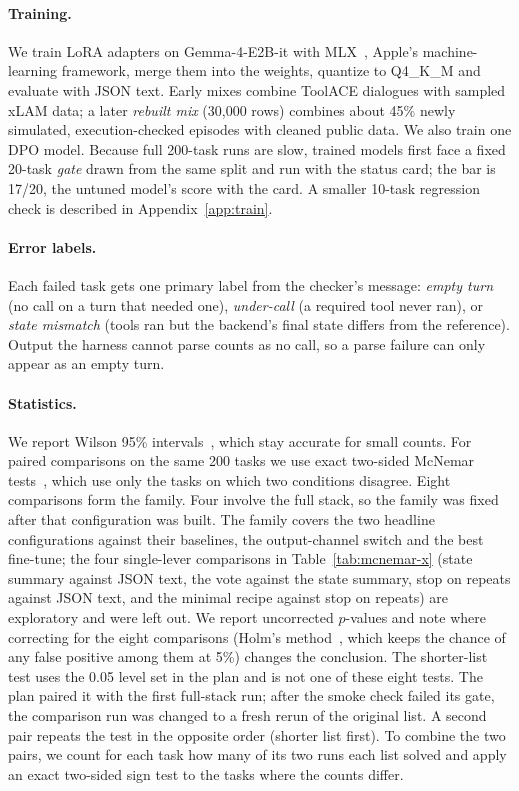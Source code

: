 \documentclass[11pt]{article}
\begin{document}
\paragraph{Training.} We train LoRA adapters on Gemma-4-E2B-it with MLX~\cite{mlx}, Apple's machine-learning framework, merge them into the weights, quantize to Q4\_K\_M and evaluate with JSON text. Early mixes combine ToolACE dialogues with sampled xLAM data; a later \emph{rebuilt mix} (30{,}000 rows) combines about 45\% newly simulated, execution-checked episodes with cleaned public data. We also train one DPO model. Because full 200-task runs are slow, trained models first face a fixed 20-task \emph{gate} drawn from the same split and run with the status card; the bar is 17/20, the untuned model's score with the card. A smaller 10-task regression check is described in Appendix~\ref{app:train}.

\paragraph{Error labels.} Each failed task gets one primary label from the checker's message: \emph{empty turn} (no call on a turn that needed one), \emph{under-call} (a required tool never ran), or \emph{state mismatch} (tools ran but the backend's final state differs from the reference). Output the harness cannot parse counts as no call, so a parse failure can only appear as an empty turn.

\paragraph{Statistics.} We report Wilson 95\% intervals~\cite{wilson1927}, which stay accurate for small counts. For paired comparisons on the same 200 tasks we use exact two-sided McNemar tests~\cite{mcnemar1947}, which use only the tasks on which two conditions disagree. Eight comparisons form the family. Four involve the full stack, so the family was fixed after that configuration was built. The family covers the two headline configurations against their baselines, the output-channel switch and the best fine-tune; the four single-lever comparisons in Table~\ref{tab:mcnemar-x} (state summary against JSON text, the vote against the state summary, stop on repeats against JSON text, and the minimal recipe against stop on repeats) are exploratory and were left out. We report uncorrected $p$-values and note where correcting for the eight comparisons (Holm's method~\cite{holm1979}, which keeps the chance of any false positive among them at 5\%) changes the conclusion. The shorter-list test uses the 0.05 level set in the plan and is not one of these eight tests. The plan paired it with the first full-stack run; after the smoke check failed its gate, the comparison run was changed to a fresh rerun of the original list. A second pair repeats the test in the opposite order (shorter list first). To combine the two pairs, we count for each task how many of its two runs each list solved and apply an exact two-sided sign test to the tasks where the counts differ.
\end{document}
